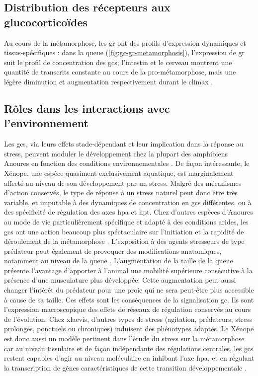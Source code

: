 \documentclass[../main.tex]{subfiles}
\begin{document}
\subsection{Distribution des récepteurs aux glucocorticoïdes}
Au cours de la métamorphose, les \gls{gr} ont des profils d'expression dynamiques et tissus-spécifiques :
dans la queue (\autoref{fig:gc-gr-metamorphosis}), l'expression de \gls{gr} suit le profil de concentration des \glspl{gc}; l'intestin et le cerveau montrent une quantité de transcrits constante au cours de la pro-métamorphose, mais une légère diminution et augmentation respectivement durant le climax \citep{Krain2004}.

\subsection{Rôles dans les interactions avec l'environnement}
Les \glspl{gc}, via leurs effets stade-dépendant et leur implication dans la réponse au stress, peuvent moduler le développement chez la plupart des amphibiens Anoures en fonction des conditions environnementales \citep{Denver2009}.
De façon intéressante, le Xénope, une espèce quasiment exclusivement aquatique, est marginalement affecté au niveau de son développement par un stress.
Malgré des mécanismes d'action conservés, le type de réponse à un stress naturel peut donc être très variable, et imputable à des dynamiques de concentration en \glspl{gc} différentes, ou à des spécificité de régulation des axes \gls{hpa} et \gls{hpt}.
Chez d'autres espèces d'Anoures au mode de vie particulièrement spécifique  et adapté à des conditions arides, les \glspl{gc} ont une action beaucoup plus spéctaculaire sur l'initiation et la rapidité de déroulement de la métamorphose \citep{Kulkarni2011,Gomez-Mestre2013a}.
L'exposition à des agents stresseurs de type prédateur peut également de provoquer des modifications anatomiques, notamment au niveau de la queue \citep{Maher2013}.
L'augmentation de la taille de la queue présente l'avantage d'apporter à l'animal une mobilité supérieure consécutive à la présence d'une musculature plus développée. Cette augmentation peut aussi changer l'intérêt du prédateur pour une proie qui ne sera peut-être plus accessible à cause de sa taille.
Ces effets sont les conséquences de la signalisation \gls{gc}.
Ils sont l'expression macroscopique des effets de réseaux de régulation conservés au cours de l'évolution.
Chez \gls{xlaevis}, d'autres types de stress (agitation, prédateurs, stress prolongés, ponctuels ou chroniques) induisent des phénotypes adaptés.
Le Xénope est donc aussi un modèle pertinent dans l'étude du stress sur la métamorphose car au niveau tissulaire et de façon indépendante des régulations centrales, les \glspl{gc} restent capables d'agir au niveau moléculaire en inhibant l'axe \gls{hpa}, et en régulant la transcription de gènes caractéristiques de cette transition développementale \citep{Hu2008,Bonett2010}.
\end{document}
